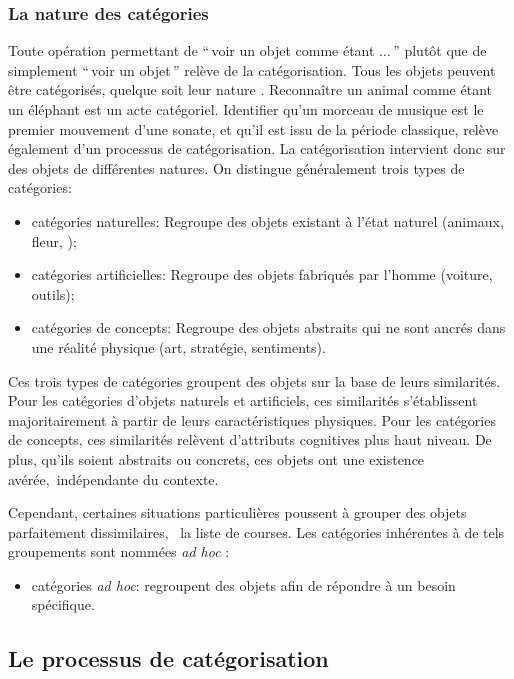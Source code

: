 \subsubsection{La nature des catégories}

Toute opération permettant de ``\,voir un objet comme étant $\ldots$\,'' plutôt que de simplement ``\,voir un objet\,'' relève de la catégorisation. Tous les objets peuvent être catégorisés, quelque soit leur nature \citep{goldstone2003concepts}. Reconnaître un animal comme étant un éléphant est un acte catégoriel. Identifier qu'un morceau de musique est le premier mouvement d'une sonate, et qu'il est issu de la période classique, relève également d'un processus de catégorisation. La catégorisation intervient donc sur des objets de différentes natures. On distingue généralement trois types de catégories:

\begin{itemize}
\item catégories naturelles: Regroupe des objets existant à l'état naturel (animaux, fleur, \etc);
\item catégories artificielles: Regroupe des objets fabriqués par l'homme (voiture, outils);
\item catégories de concepts:  Regroupe des objets abstraits qui ne sont ancrés dans une réalité physique (art, stratégie, sentiments).
\end{itemize}

Ces trois types de catégories groupent des objets sur la base de leurs similarités. Pour les catégories d'objets naturels et artificiels, ces similarités s'établissent majoritairement à partir de leurs caractéristiques physiques. Pour les catégories de concepts, ces similarités relèvent d'attributs cognitives plus haut niveau. De plus, qu'ils soient abstraits ou concrets, ces objets ont une existence avérée,\ie~indépendante du contexte.

Cependant, certaines situations particulières poussent à grouper des objets parfaitement dissimilaires, \eg~la liste de courses. Les catégories inhérentes à de tels groupements sont nommées \emph{ad hoc} \citep{barsalou1983ad}:

\begin{itemize}
 \item catégories \emph{ad hoc}:  regroupent des objets afin de répondre à un besoin spécifique.
\end{itemize}

\subsection{Le processus de catégorisation}

